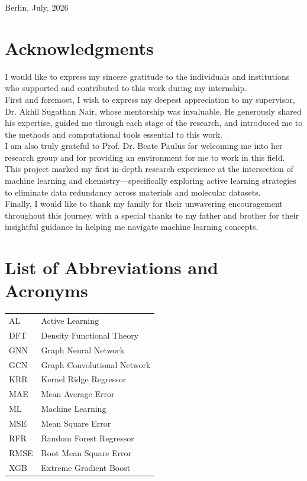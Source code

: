 		Berlin, July, 2026
		
	\pagebreak
	
	\section*{Acknowledgments}
		I would like to express my sincere gratitude to the individuals and institutions who
		supported and contributed to this work during my internship.\\
		
		First and foremost, I wish to express my deepest appreciation to my supervisor, Dr. Akhil Sugathan Nair,
		whose mentorship was invaluable. He generously shared his expertise,
		guided me through each stage of the research, and introduced me to the methods and computational
		tools essential to this work.\\
		
		I am also truly grateful to Prof. Dr. Beate Paulus for welcoming me into her research group and for providing an environment for me to work in this field.\\
		
		This project marked my first in-depth research experience at the intersection of machine learning and chemistry—specifically exploring active learning strategies to eliminate data redundancy across materials and molecular datasets.\\
		
		Finally, I would like to thank my family for their unwavering encouragement throughout this journey, with a special thanks to my father and brother for their insightful guidance in helping me navigate machine learning concepts.
		
	\pagebreak
	
	\section*{List of Abbreviations and Acronyms}
		\begin{tabularx}{\textwidth}{lX}
			AL & Active Learning\\
			DFT & Density Functional Theory\\
			GNN & Graph Neural Network\\
			GCN & Graph Convolutional Network\\
			KRR & Kernel Ridge Regressor\\
			MAE & Mean Average Error\\
			ML & Machine Learning\\
			MSE & Mean Square Error\\
			RFR & Random Forest Regressor\\
			RMSE & Root Mean Square Error\\
			XGB & Extreme Gradient Boost\\		
		\end{tabularx}
		
